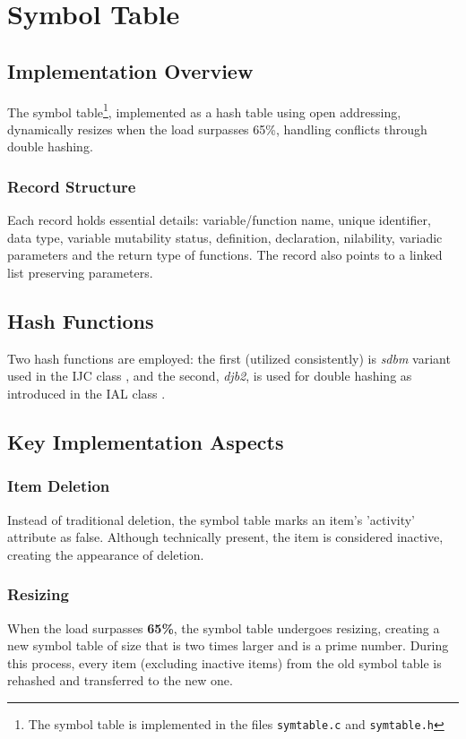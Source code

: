 \section{Symbol Table}
\label{symtable}
\subsection{Implementation Overview}
The symbol table\footnote{The symbol table is implemented in the files \texttt{symtable.c} and \texttt{symtable.h}}, implemented as a hash table using open addressing, dynamically resizes when the load surpasses 65\%, handling conflicts through double hashing.

\subsubsection{Record Structure}
Each record holds essential details: variable/function name, unique identifier, data type, variable mutability status, definition, declaration, nilability, variadic parameters and the return type of functions. The record also points to a linked list preserving parameters.

\subsection{Hash Functions}
Two hash functions are employed: the first (utilized consistently) is \textit{sdbm} variant used in the IJC class \cite{ijc}, and the second, \textit{djb2}, is used for double hashing as introduced in the IAL class \cite{djb2}.

\subsection{Key Implementation Aspects}

\subsubsection{Item Deletion}
Instead of traditional deletion, the symbol table marks an item's 'activity' attribute as false. Although technically present, the item is considered inactive, creating the appearance of deletion.

\subsubsection{Resizing}
When the load surpasses \textbf{65\%}, the symbol table undergoes resizing, creating a new symbol table of size that is two times larger and is a prime number. During this process, every item (excluding inactive items) from the old symbol table is rehashed and transferred to the new one.

